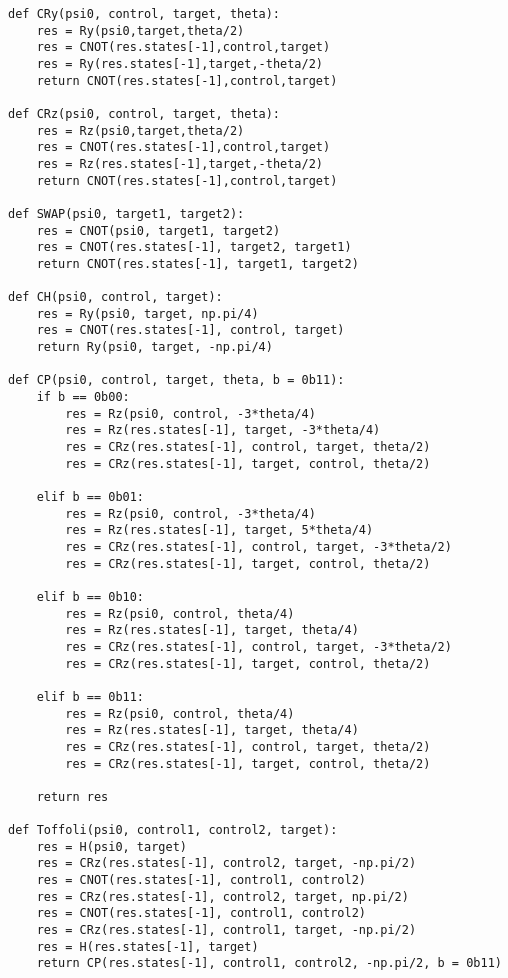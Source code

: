 \begin{verbatim}
def CRy(psi0, control, target, theta):
    res = Ry(psi0,target,theta/2)
    res = CNOT(res.states[-1],control,target)
    res = Ry(res.states[-1],target,-theta/2)
    return CNOT(res.states[-1],control,target)

def CRz(psi0, control, target, theta):
    res = Rz(psi0,target,theta/2)
    res = CNOT(res.states[-1],control,target)
    res = Rz(res.states[-1],target,-theta/2)
    return CNOT(res.states[-1],control,target)

def SWAP(psi0, target1, target2):
    res = CNOT(psi0, target1, target2)
    res = CNOT(res.states[-1], target2, target1)
    return CNOT(res.states[-1], target1, target2)

def CH(psi0, control, target):
    res = Ry(psi0, target, np.pi/4)
    res = CNOT(res.states[-1], control, target)
    return Ry(psi0, target, -np.pi/4)

def CP(psi0, control, target, theta, b = 0b11):
    if b == 0b00:
        res = Rz(psi0, control, -3*theta/4)
        res = Rz(res.states[-1], target, -3*theta/4)
        res = CRz(res.states[-1], control, target, theta/2)
        res = CRz(res.states[-1], target, control, theta/2)

    elif b == 0b01:
        res = Rz(psi0, control, -3*theta/4)
        res = Rz(res.states[-1], target, 5*theta/4)
        res = CRz(res.states[-1], control, target, -3*theta/2)
        res = CRz(res.states[-1], target, control, theta/2)

    elif b == 0b10:
        res = Rz(psi0, control, theta/4)
        res = Rz(res.states[-1], target, theta/4)
        res = CRz(res.states[-1], control, target, -3*theta/2)
        res = CRz(res.states[-1], target, control, theta/2)

    elif b == 0b11:
        res = Rz(psi0, control, theta/4)
        res = Rz(res.states[-1], target, theta/4)
        res = CRz(res.states[-1], control, target, theta/2)
        res = CRz(res.states[-1], target, control, theta/2)

    return res

def Toffoli(psi0, control1, control2, target):
    res = H(psi0, target)
    res = CRz(res.states[-1], control2, target, -np.pi/2)
    res = CNOT(res.states[-1], control1, control2)
    res = CRz(res.states[-1], control2, target, np.pi/2)
    res = CNOT(res.states[-1], control1, control2)
    res = CRz(res.states[-1], control1, target, -np.pi/2)
    res = H(res.states[-1], target)
    return CP(res.states[-1], control1, control2, -np.pi/2, b = 0b11)


\end{verbatim}
